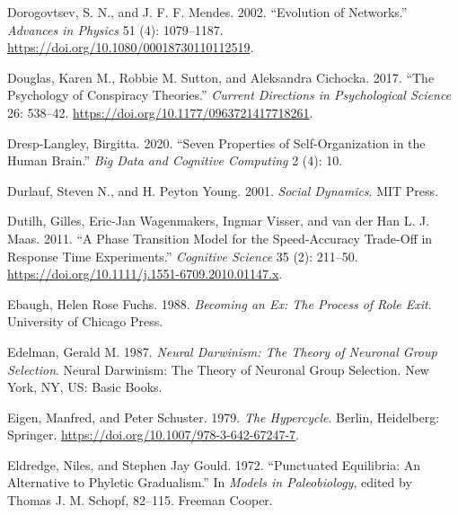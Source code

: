\documentclass[
  a4paper,
  DIV=11,
  numbers=noendperiod]{scrreprt}
\newlength{\cslhangindent}
\newlength{\cslentryspacingunit} %
\newenvironment{CSLReferences}[2] %
 {%
  \setlength{\parindent}{0pt}
  \ifodd #1
  \let\oldpar\par
  \def\par{\hangindent=\cslhangindent\oldpar}
  \fi
  \setlength{\parskip}{#2\cslentryspacingunit}
 }%
 {}
\begin{document}
\begin{CSLReferences}{1}{0}
\leavevmode{}%
Dorogovtsev, S. N., and J. F. F. Mendes. 2002. {``Evolution of
Networks.''} \emph{Advances in Physics} 51 (4): 1079--1187.
\url{https://doi.org/10.1080/00018730110112519}.

\leavevmode{}%
Douglas, Karen M., Robbie M. Sutton, and Aleksandra Cichocka. 2017.
{``The Psychology of Conspiracy Theories.''} \emph{Current Directions in
Psychological Science} 26: 538--42.
\url{https://doi.org/10.1177/0963721417718261}.

\leavevmode{}%
Dresp-Langley, Birgitta. 2020. {``Seven {Properties} of
{Self-Organization} in the {Human Brain}.''} \emph{Big Data and
Cognitive Computing} 2 (4): 10.

\leavevmode{}%
Durlauf, Steven N., and H. Peyton Young. 2001. \emph{Social {Dynamics}}.
{MIT Press}.

\leavevmode{}%
Dutilh, Gilles, Eric-Jan Wagenmakers, Ingmar Visser, and van der Han L.
J. Maas. 2011. {``A {Phase Transition Model} for the {Speed-Accuracy
Trade-Off} in {Response Time Experiments}.''} \emph{Cognitive Science}
35 (2): 211--50. \url{https://doi.org/10.1111/j.1551-6709.2010.01147.x}.

\leavevmode{}%
Ebaugh, Helen Rose Fuchs. 1988. \emph{Becoming an Ex: The Process of
Role Exit}. University of Chicago Press.

\leavevmode{}%
Edelman, Gerald M. 1987. \emph{Neural {Darwinism}: {The} Theory of
Neuronal Group Selection}. Neural {Darwinism}: {The} Theory of Neuronal
Group Selection. {New York, NY, US}: {Basic Books}.

\leavevmode{}%
Eigen, Manfred, and Peter Schuster. 1979. \emph{The {Hypercycle}}.
{Berlin, Heidelberg}: {Springer}.
\url{https://doi.org/10.1007/978-3-642-67247-7}.

\leavevmode{}%
Eldredge, Niles, and Stephen Jay Gould. 1972. {``Punctuated
{Equilibria}: {An Alternative} to {Phyletic Gradualism}.''} In
\emph{Models in {Paleobiology}}, edited by Thomas J. M. Schopf, 82--115.
{Freeman Cooper}.


\end{CSLReferences}
\end{document}
